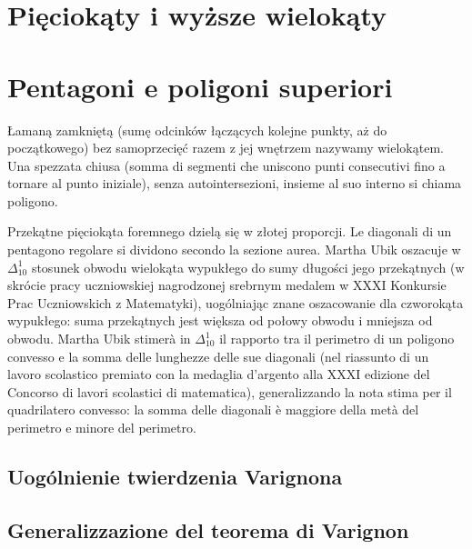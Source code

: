 
%

\chapter{Pięciokąty i wyższe wielokąty} %
\chapter{Pentagoni e poligoni superiori} %

\begin{definition}[wielokąt]
Łamaną zamkniętą (sumę odcinków łączących kolejne punkty, aż do początkowego) bez samoprzecięć razem z jej wnętrzem nazywamy wielokątem. %
Una spezzata chiusa (somma di segmenti che uniscono punti consecutivi fino a tornare al punto iniziale), senza autointersezioni, insieme al suo interno si chiama poligono. %
\end{definition}

Przekątne pięciokąta foremnego dzielą się w złotej proporcji. %
Le diagonali di un pentagono regolare si dividono secondo la sezione aurea. %
Martha Ubik oszacuje w $\Delta_{10}^1$ stosunek obwodu wielokąta wypukłego do sumy długości jego przekątnych (w skrócie pracy uczniowskiej nagrodzonej srebrnym medalem w XXXI Konkursie Prac Uczniowskich z Matematyki), uogólniając znane oszacowanie dla czworokąta wypukłego: suma przekątnych jest większa od połowy obwodu i mniejsza od obwodu. %
Martha Ubik stimerà in $\Delta_{10}^1$ il rapporto tra il perimetro di un poligono convesso e la somma delle lunghezze delle sue diagonali (nel riassunto di un lavoro scolastico premiato con la medaglia d'argento alla XXXI edizione del Concorso di lavori scolastici di matematica), generalizzando la nota stima per il quadrilatero convesso: la somma delle diagonali è maggiore della metà del perimetro e minore del perimetro. %

\section{Uogólnienie twierdzenia Varignona} %
\section{Generalizzazione del teorema di Varignon} %

